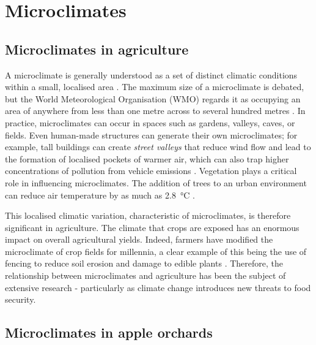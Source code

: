 \section{Microclimates}

\subsection{Microclimates in agriculture}

A microclimate is generally understood as a set of distinct climatic conditions
within a small, localised area \cite{MetOffice2023}. The maximum
size of a microclimate is debated, but the World Meteorological Organisation
(WMO) regards it as occupying an area of anywhere from less than one metre
across to several hundred metres \cite{wmo2024}.  In practice, microclimates can
occur in spaces such as gardens, valleys, caves, or fields. Even human-made
structures can generate their own microclimates; for example, tall buildings can
create \emph{street valleys} that reduce wind flow and lead to the formation of
localised pockets of warmer air, which can also trap higher concentrations of
pollution from vehicle emissions \cite{yang2023}. Vegetation plays a critical
role in influencing microclimates. The addition of trees to an urban environment
can reduce air temperature by as much as \SI{2.8}{\degreeCelsius}
\cite{lai2019}.

This localised climatic variation, characteristic of microclimates, is therefore
significant in agriculture. The climate that crops are exposed has an enormous
impact on overall agricultural yields. Indeed, farmers have modified the
microclimate of crop fields for millennia, a clear example of this being the use
of fencing to reduce soil erosion and damage to edible plants \cite{cleugh1998}.
Therefore, the relationship between microclimates and agriculture has been the
subject of extensive research - particularly as climate change introduces new
threats to food security.

\subsection{Microclimates in apple orchards}




